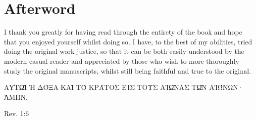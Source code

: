 \chapter*{Afterword}

I thank you greatly for having read through the entirety of the book and hope that you enjoyed yourself whilst doing so. I have, to the best of my abilities, tried doing the original work justice, so that it can be both easily understood by the modern casual reader and appreciated by those who wish to more thoroughly study the original manuscripts, whilst still being faithful and true to the original. 
\bigskip\bigskip

\epigraph{\uppercase{αὐτῷ ἡ δόξα καὶ τὸ κράτος εἰς τοὺς αἰῶνας τῶν αἰώνων· ἀμήν.}}{Rev. 1:6}